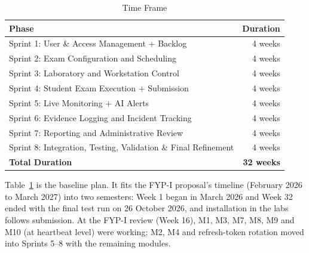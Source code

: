 \begin{table}[H]
\centering
\caption{Time Frame}
\label{tab:timeframe}
\renewcommand{\arraystretch}{1.2}
\begin{tabular*}{\linewidth}{@{\extracolsep{\fill}}lr}
\hline\hline
\textbf{Phase} & \textbf{Duration} \\
\hline
Sprint 1: User \& Access Management + Backlog & 4 weeks \\
Sprint 2: Exam Configuration and Scheduling & 4 weeks \\
Sprint 3: Laboratory and Workstation Control & 4 weeks \\
Sprint 4: Student Exam Execution + Submission & 4 weeks \\
Sprint 5: Live Monitoring + AI Alerts & 4 weeks \\
Sprint 6: Evidence Logging and Incident Tracking & 4 weeks \\
Sprint 7: Reporting and Administrative Review & 4 weeks \\
Sprint 8: Integration, Testing, Validation \& Final Refinement & 4 weeks \\
\hline
\textbf{Total Duration} & \textbf{32 weeks} \\
\hline\hline
\end{tabular*}
\end{table}

Table~\ref{tab:timeframe} is the baseline plan. It fits the FYP-I proposal's timeline (February 2026 to March 2027) into two semesters: Week 1 began in March 2026 and Week 32 ended with the final test run on 26 October 2026, and installation in the labs follows submission. At the FYP-I review (Week 16), M1, M3, M7, M8, M9 and M10 (at heartbeat level) were working; M2, M4 and refresh-token rotation moved into Sprints 5--8 with the remaining modules.
